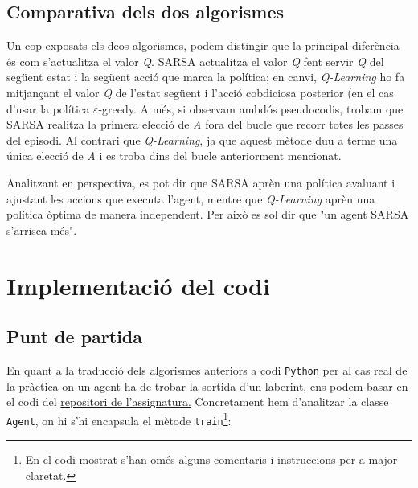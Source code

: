 \documentclass{article}
\begin{document}
\subsection{Comparativa dels dos algorismes}

Un cop exposats els deos algorismes, podem distingir que la principal diferència és com s'actualitza el valor \textit{Q}. SARSA actualitza el valor \textit{Q} fent servir \textit{Q} del següent estat i la següent acció que marca la política; en canvi, \textit{Q-Learning} ho fa mitjançant el valor \textit{Q} de l'estat següent i l'acció cobdiciosa posterior (en el cas d'usar la política \(\varepsilon\)-greedy. A més, si observam ambdós pseudocodis, trobam que SARSA realitza la primera elecció de \textit{A} fora del bucle que recorr totes les passes del episodi. Al contrari que \textit{Q-Learning}, ja que aquest mètode duu a terme una única elecció de \textit{A} i es troba dins del bucle anteriorment mencionat.

Analitzant en perspectiva, es pot dir que SARSA aprèn una política avaluant i ajustant les accions que executa l'agent, mentre que \textit{Q-Learning} aprèn una política òptima de manera independent. Per això es sol dir que "un agent SARSA s'arrisca més".

\newpage

\section{Implementació del codi}
\subsection{Punt de partida}
En quant a la traducció dels algorismes anteriors a codi \verb|Python| per al cas real de la pràctica on un agent ha de trobar la sortida d'un laberint, ens podem basar en el codi del \href{https://github.com/miquelmn/ia_2024/tree/master/reinforcement}{repositori de l'assignatura.} Concretament hem d'analitzar la classe \verb|Agent|, on hi s'hi encapsula el mètode \verb|train|\footnote{En el codi mostrat s'han omés alguns comentaris i instruccions per a major claretat.}:
\end{document}
